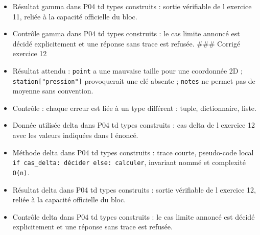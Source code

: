 \begin{itemize}
  Méthode gamma dans P04 td types construits : trace courte, pseudo-code
  local \texttt{if\ cas\_gamma:\ décider\ else:\ calculer}, invariant
  nommé et complexité \texttt{O(n)}.
\item
  Résultat gamma dans P04 td types construits : sortie vérifiable de l
  exercice 11, reliée à la capacité officielle du bloc.
\item
  Contrôle gamma dans P04 td types construits : le cas limite annoncé
  est décidé explicitement et une réponse sans trace est refusée. \#\#\#
  Corrigé exercice 12
\item
  Résultat attendu : \texttt{point} a une mauvaise taille pour une
  coordonnée 2D ; \texttt{station{[}"pression"{]}} provoquerait une clé
  absente ; \texttt{notes} ne permet pas de moyenne sans convention.
\item
  Contrôle : chaque erreur est liée à un type différent : tuple,
  dictionnaire, liste.
\item
  Donnée utilisée delta dans P04 td types construits : cas delta de l
  exercice 12 avec les valeurs indiquées dans l énoncé.
\item
  Méthode delta dans P04 td types construits : trace courte, pseudo-code
  local \texttt{if\ cas\_delta:\ décider\ else:\ calculer}, invariant
  nommé et complexité \texttt{O(n)}.
\item
  Résultat delta dans P04 td types construits : sortie vérifiable de l
  exercice 12, reliée à la capacité officielle du bloc.
\item
  Contrôle delta dans P04 td types construits : le cas limite annoncé
  est décidé explicitement et une réponse sans trace est refusée.
\end{itemize}
